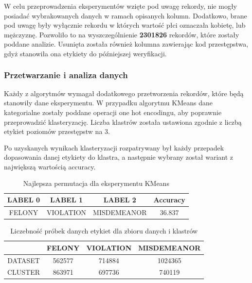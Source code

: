 \documentclass{classrep}
\begin{document}
{{{                W celu przeprowadzenia eksperymentów wzięte pod uwagę rekordy, nie mogły posiadać wybrakowanych danych w ramach opisanych kolumn. Dodatkowo, brane pod uwagę były wyłącznie rekordu w których wartość płci oznaczała kobietę, lub mężczyznę. Pozwoliło to na wyszczególnienie \textbf{2301826} rekordów, które zostały poddane analizie. Usunięta została również kolumna zawierając kod przestępstwa, gdyż stanowiła ona etykiety do późniejszej weryfikacji. 
            }

            \subsubsection{Przetwarzanie i analiza danych} {
                Każdy z algorytmów wymagał dodatkowego przetworzenia rekordów, które będą stanowiły dane eksperymentu. W przypadku algorytmu KMeans dane kategorialne zostały poddane operacji one hot encodingu, aby poprawnie przeprowadzić klasteryzację. Liczba klastrów została ustawiona zgodnie z liczbą etykiet poziomów przestępstw na 3.
                
                Po uzyskanych wynikach klasteryzacji rozpatrywany był każdy przepadek dopasowania danej etykiety do klastra, a następnie wybrany został wariant z największą wartością accuracy.
                
                \begin{table}[!htbp]
                \centering
                \begin{tabular}{|c|c|c|c|}
                    \hline
                    LABEL 0 & LABEL 1 & LABEL 2 & Accuracy \\ \hline
                    FELONY  & VIOLATION  & MISDEMEANOR & 36.837 \\
                    \hline
                \end{tabular}
                \caption{Najlepsza permutacja dla eksperymentu KMeans}
                \label{tab:kmeans_lab}
                \end{table}
                
                \begin{table}[!htbp]
                \centering
                \begin{tabular}{|c|c|c|c|}
                    \hline
                    & FELONY  & VIOLATION  & MISDEMEANOR \\ \hline
                    DATASET & 562577 & 714884 & 1024365 \\
                    CLUSTER & 863971 & 697736 & 740119 \\ 
                    \hline
                \end{tabular}
                \caption{Liczebność próbek danych etykiet dla zbioru danych i klastrów}
                \label{tab:kmeans_samples}
                \end{table}
                
}}}
\end{document}

